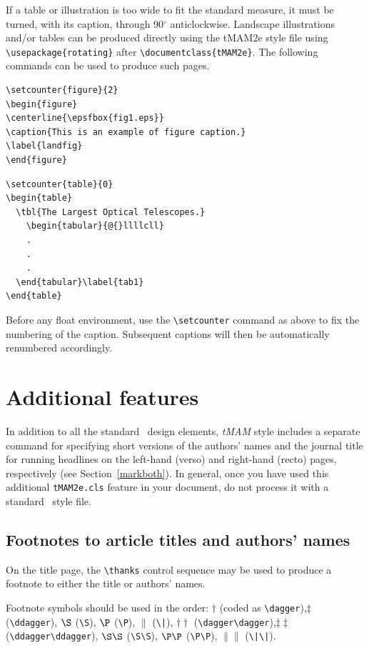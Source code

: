 \documentclass[]{tMAM2e}
\begin{document}
If a table or illustration is too wide to fit the standard measure,
it must be turned, with its caption, through 90$^{\circ}$
anticlockwise. Landscape illustrations and/or tables can be produced
directly using the tMAM2e style file using
\verb"\usepackage{rotating}" after \verb"\documentclass{tMAM2e}".
The following commands can be used to produce such pages.
%
\begin{verbatim}
\setcounter{figure}{2}
\begin{figure}
\centerline{\epsfbox{fig1.eps}}
\caption{This is an example of figure caption.}
\label{landfig}
\end{figure}
\end{verbatim}
%
\begin{verbatim}
\setcounter{table}{0}
\begin{table}
  \tbl{The Largest Optical Telescopes.}
    \begin{tabular}{@{}llllcll}
    .
    .
    .
  \end{tabular}\label{tab1}
\end{table}
\end{verbatim}
%
Before any float environment, use the \verb"\setcounter" command
as above to fix the numbering of the caption. Subsequent captions
will then be automatically renumbered accordingly.


\section{Additional features}

In addition to all the standard \LaTeXe\ design elements, {\it tMAM} style includes a separate command for specifying short versions of the authors' names and the journal title for running headlines on the left-hand (verso) and right-hand (recto) pages, respectively (see Section~\ref{markboth}).  In general, once you have used this additional {\tt tMAM2e.cls} feature in your document, do not process it with a standard \LaTeXe\ style file.

\subsection{Footnotes to article titles and authors' names}

On the title page, the \verb"\thanks" control sequence may be used to produce a footnote to either the title or authors' names.

Footnote symbols should be used in the order: $\dagger$
(coded as \verb"\dagger"),\break $\ddagger$ (\verb"\ddagger"), $\S$ (\verb"\S"),
$\P$ (\verb"\P"), $\|$ (\verb"\|"), $\dagger\dagger$
(\verb"\dagger\dagger"),\break $\ddagger\ddagger$
(\verb"\ddagger\ddagger"),  $\S\S$ (\verb"\S\S"), $\P\P$ (\verb"\P\P"),
$\|\|$ (\verb"\|\|").
\end{document}
